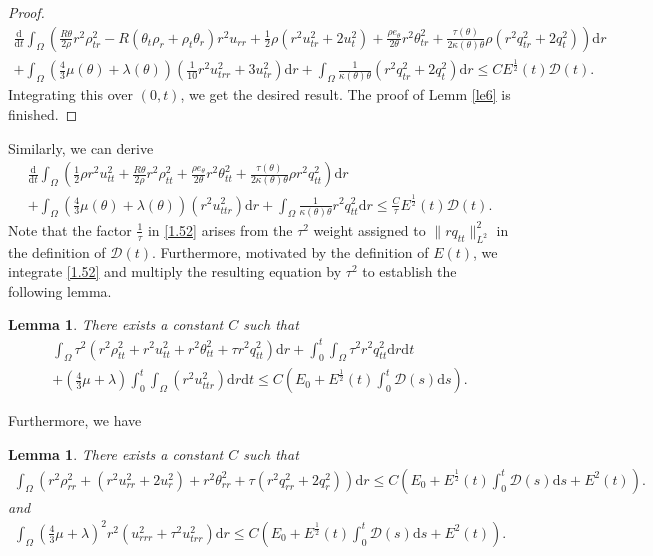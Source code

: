 \documentclass[11pt,reqno]{amsart}
\numberwithin{equation}{section}
\newtheorem{lemma}[theorem]{Lemma}
\newcommand{\dif}{\mathrm{d}}
\newcommand{\intx}{\int_0^t \int_{\Omega} }
\begin{document}
\begin{proof}
{\begin{align}
  \frac{\dif}{\dif t} \int_{\Omega} \left(\frac{R\theta}{2\rho} r^2 \rho_{tr}^2 -R(\theta_t \rho_r+\rho_t\theta_r)r^2u_{rr} + \frac{1}{2}\rho( r^2 u_{tr}^2+2u_t^2)+\frac{\rho e_\theta}{2\theta} r^2 \theta_{tr}^2+\frac{\tau(\theta)}{2\kappa(\theta)\theta} \rho (r^2 q_{tr}^2+2q_t^2) \right)\dif r \nonumber\\
+ \int_{\Omega} \left(\frac{4}{3} \mu(\theta)+\lambda(\theta)\right)\left(\frac{1}{10} r^2 u_{trr}^2+3u_{tr}^2\right) \dif r +\int_{\Omega} \frac{1}{\kappa(\theta)\theta} (r^2 q_{tr}^2+2q_t^2) \dif r \le CE^\frac{1}{2}(t) \mathcal D(t). \label{1.51}
 \end{align}}
 Integrating this over $(0, t)$, we get the desired result. The proof of Lemm \ref{le6} is finished.
 \end{proof}
  Similarly, we can derive
 \begin{align}
  \frac{\dif}{\dif t} \int_{\Omega}  \left( \frac{1}{2}\rho r^2 u_{tt}^2+\frac{R\theta}{2\rho} r^2 \rho_{tt}^2+\frac{\rho e_\theta}{2\theta} r^2 \theta_{tt}^2+\frac{\tau(\theta)}{2\kappa(\theta)\theta} \rho r^2 q_{tt}^2 \right)\dif r \nonumber\\
+ \int_{\Omega} \left(\frac{4}{3} \mu(\theta)+\lambda(\theta)\right)\left(r^2 u_{ttr}^2\right) \dif r +\int_{\Omega} \frac{1}{\kappa(\theta)\theta} r^2 q_{tt}^2 \dif r \le \frac{C}{\tau} E^\frac{1}{2}(t) \mathcal D(t). \label{1.52}
 \end{align}
Note that the factor $\frac{1}{\tau}$ in \eqref{1.52} arises from the $\tau^2$ weight assigned to $\|r q_{tt}\|_{L^2}^2$ in the definition of $\mathcal{D}(t)$. Furthermore, motivated by the definition of $E(t)$, we integrate \eqref{1.52} and multiply the resulting equation by $\tau^2$ to establish the following lemma.
  \begin{lemma}\label{le7}
 There exists a constant $C$ such that
 \begin{align}
 \int_{\Omega} \tau^2 \left( r^2 \rho_{tt}^2+r^2 u_{tt}^2+r^2 \theta_{tt}^2 +\tau r^2 q_{tt}^2 \right) \dif r + \intx  \tau^2 r^2q_{tt}^2 \dif r \dif t\nonumber\\
 +   \left(\frac{4}{3} \mu +\lambda \right) \intx \left(r^2 u_{ttr}^2\right) \dif r \dif t
 \le C(E_0+E^\frac{1}{2}(t) \int_0^t  \mathcal D(s)\dif s). \label{1.53}
 \end{align}
 \end{lemma}
Furthermore, we have
 \begin{lemma}\label{le8}
 There exists a constant $C$ such that{\small
 \begin{align}
 \int_{\Omega} \left( r^2 \rho_{rr}^2+(r^2 u_{rr}^2+2u_r^2)+r^2 \theta_{rr}^2 +\tau( r^2 q_{rr}^2+2q_r^2) \right) \dif r
 \le C(E_0+E^\frac{1}{2}(t) \int_0^t  \mathcal D(s)\dif s+E^2(t)). \label{1.54}
 \end{align}}
 and
 \begin{align}\label{1.54-1}
 \int_{\Omega} \left(\frac{4}{3} \mu+\lambda\right)^2r^2 (u_{rrr}^2+\tau^2 u_{trr}^2) \dif r \le C(E_0+E^\frac{1}{2}(t) \int_0^t  \mathcal D(s)\dif s+E^2(t)).
 \end{align}
 \end{lemma}
\end{document}
